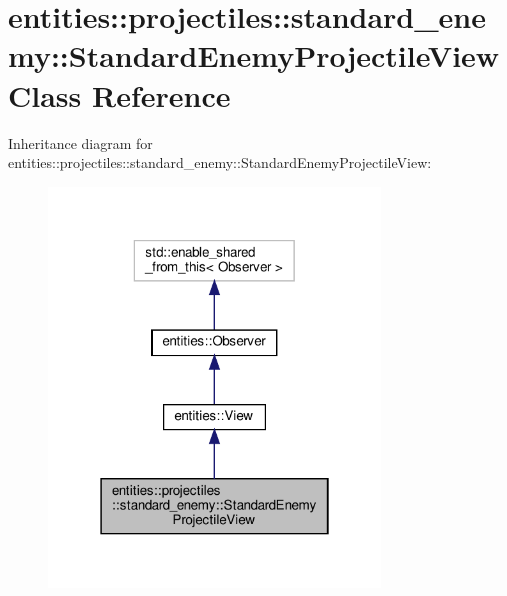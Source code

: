 \hypertarget{classentities_1_1projectiles_1_1standard__enemy_1_1StandardEnemyProjectileView}{}\section{entities\+:\+:projectiles\+:\+:standard\+\_\+enemy\+:\+:Standard\+Enemy\+Projectile\+View Class Reference}
\label{classentities_1_1projectiles_1_1standard__enemy_1_1StandardEnemyProjectileView}


Inheritance diagram for entities\+:\+:projectiles\+:\+:standard\+\_\+enemy\+:\+:Standard\+Enemy\+Projectile\+View\+:\nopagebreak
\begin{figure}[H]
\begin{center}
\leavevmode
\includegraphics[width=250pt]{classentities_1_1projectiles_1_1standard__enemy_1_1StandardEnemyProjectileView__inherit__graph}
\end{center}
\end{figure}



